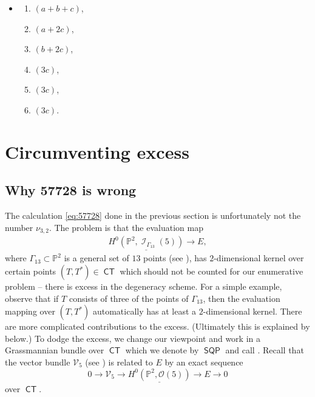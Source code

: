 \documentclass{article}
\renewcommand{\P}{\mathbb{P}}
\DeclareMathOperator{\I}{\mathcal{I}}
\renewcommand{\O}{\mathcal{O}}
\DeclareMathOperator{\CT}{\mathsf{CT}}
\DeclareMathOperator{\SQP}{\mathsf{SQP}}
\begin{document}
\begin{proposition}
\begin{itemize}
\begin{enumerate}
        \item $(3a,3b,3c)$,
        \item $(3a,b+2c,3c)$,
        \item $(3b,b+2c,3c)$,
        \item $(b+2c,2b+c,3c)$,
        \item $(a+2c,b+2c,3c)$,
        \item $(a+2c,b+2c,3c)$.
    \end{enumerate}
    \item[$\O(H)$:] \begin{enumerate}
        \item $(a+b+c)$,
        \item $(a+2c)$,
        \item $(b+2c)$,
        \item $(3c)$,
        \item $(3c)$,
        \item $(3c)$. 
    \end{enumerate}
\end{itemize}
\end{proposition} 

\section{Circumventing excess}
\label{sec:pencilspace}

\subsection{Why 57728 is wrong}

The calculation \eqref{eq:57728} done in the previous section is unfortunately not the number $\nu_{3,2}$.  The problem is that the  evaluation map 
\begin{align}
    \label{eq:ev}
\underline{H^{0}(\P^{2}, \I_{\Gamma_{13}}(5))} \to E,
\end{align}
where $\Gamma_{13} \subset \P^{2}$ is a general set of $13$ points (see ), has $2$-dimensional kernel over certain points $(T,T^{*}) \in \CT$ which should not be counted for our enumerative problem -- there is excess in the degeneracy scheme.  For a simple example, observe that if $T$ consists of three of the points of $\Gamma_{13}$, then the evaluation mapping over $(T,T^{*})$ automatically has at least a $2$-dimensional kernel. There are more complicated contributions to the excess. (Ultimately this is explained by  below.) To dodge the excess, we change our viewpoint and work in a Grassmannian bundle over $\CT$ which we denote by $\SQP$ and call .  Recall that the vector bundle $\mathcal{V}_{5}$ (see ) is related to $E$ by an exact sequence $$0 \to \mathcal{V}_{5} \to \underline{H^{0}(\P^{2}, \O(5))} \to E \to 0$$ over $\CT$.
\end{document}
